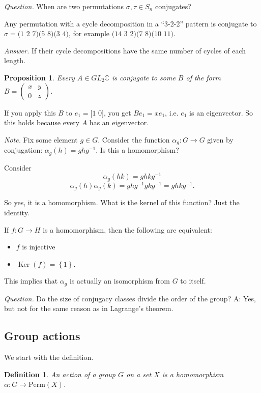 \documentclass[12pt]{article}
\newtheorem*{definition}{Definition}
\newtheorem*{prop}{Proposition}
\DeclareMathOperator{\Ker}{Ker}
\newcommand*{\mat}[1]{\begin{pmatrix}#1\end{pmatrix}}
\def\CC{\mathbb{C}}
\newcommand*{\mat}[1]{\begin{pmatrix}#1\end{pmatrix}}
\begin{document}
  {\it Question.} When are two permutations $\sigma, \tau \in S_n$ conjugates?

  Any permutation with a cycle decomposition in a ``3-2-2'' pattern is conjugate to $\sigma = \text{(1 2 7)(5 8)(3 4)}$, for example $\text{(14 3 2)(7 8)(10 11)}$.

  {\it Answer.} If their cycle decompositions have the same number of cycles of each length.

  \begin{prop}
    Every $A \in GL_2 \CC$ is conjugate to some $B$ of the form $B = \mat{x & y \\ 0 & z}$.
  \end{prop}

  If you apply this $B$ to $e_1 = \text{[1 0]}$, you get $B e_1 = x e_1$, i.e. $e_1$ is an eigenvector. So this holds because every $A$ has an eigenvector.

  {\it Note.} Fix some element $g \in G$.  Consider the function $\alpha_g : G \to G$ given by conjugation: $\alpha_g(h) = ghg^{-1}$.  Is this a homomorphism?

Consider
\[
  \alpha_g(hk) = g hk g^{-1}
\]
\[
  \alpha_g(h) \alpha_g(k) = ghg^{-1} g k g^{-1} = ghk g^{-1}.
  \]

  So yes, it is a homomorphism.  What is the kernel of this function?  Just the identity.

  If $f : G \to H$ is a homomorphism, then the following are equivalent:

  \begin{itemize}
    \item $f$ is injective
    \item $\Ker(f) = \left\{ 1 \right\}$.
  \end{itemize}

  This implies that $\alpha_g$ is actually an isomorphism from $G$ to itself.

  {\it Question.} Do the size of conjugacy classes divide the order of the group?  A: Yes, but not for the same reason as in Lagrange's theorem.

  \subsection{Group actions}
  
  We start with the definition. \\

  \begin{definition}
    An action of a group $G$ on a set $X$ is a homomorphism $\alpha: G \to \text{Perm}(X)$.
  \end{definition}
\end{document}
